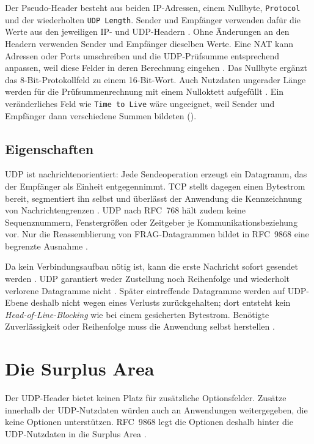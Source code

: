 Der Pseudo-Header besteht aus beiden IP-Adressen, einem Nullbyte, \texttt{Protocol} und der wiederholten
\texttt{UDP Length}. Sender und Empfänger verwenden dafür die Werte aus den jeweiligen IP- und UDP-Headern
\cite{rfc768}. Ohne Änderungen an den Headern verwenden Sender und Empfänger dieselben Werte.
Eine NAT kann Adressen oder Ports umschreiben und die UDP-Prüfsumme entsprechend anpassen, weil diese Felder
in deren Berechnung eingehen \cite[Sec.~11.3]{rfc9868}. Das Nullbyte ergänzt das 8-Bit-Protokollfeld zu einem
16-Bit-Wort. Auch Nutzdaten ungerader Länge werden für die Prüfsummenrechnung mit einem Nulloktett aufgefüllt
\cite{rfc768,rfc1071}. Ein veränderliches Feld wie \texttt{Time to Live} wäre ungeeignet, weil
Sender und Empfänger dann verschiedene Summen bildeten ().

\newpage

\subsection{Eigenschaften}
\label{subsec:udp-eigenschaften}

UDP ist nachrichtenorientiert: Jede Sendeoperation erzeugt ein Datagramm, das der Empfänger als Einheit
entgegennimmt. TCP stellt dagegen einen Bytestrom bereit, segmentiert ihn selbst und überlässt der Anwendung
die Kennzeichnung von Nachrichtengrenzen \cite[Sec.~2.2 und 3.7]{rfc9293}. UDP nach RFC~768 hält zudem keine
Sequenznummern, Fenstergrößen oder Zeitgeber je Kommunikationsbeziehung vor. Nur die Reassemblierung von
FRAG-Datagrammen bildet in RFC~9868 eine begrenzte Ausnahme \cite[Sec.~6]{rfc9868}.

Da kein Verbindungsaufbau nötig ist, kann die erste Nachricht sofort gesendet werden
\cite[Sec.~1]{rfc8085}. UDP garantiert weder Zustellung noch Reihenfolge und wiederholt verlorene
Datagramme nicht \cite{rfc768}. Später eintreffende Datagramme werden auf UDP-Ebene deshalb nicht wegen
eines Verlusts zurückgehalten; dort entsteht kein \textit{Head-of-Line-Blocking} wie bei einem gesicherten
Bytestrom. Benötigte Zuverlässigkeit oder Reihenfolge muss die Anwendung selbst herstellen
\cite[Sec.~3.3]{rfc8085}.

\section{Die Surplus Area}
\label{sec:surplus-area}

Der UDP-Header bietet keinen Platz für zusätzliche Optionsfelder. Zusätze innerhalb der UDP-Nutzdaten
würden auch an Anwendungen weitergegeben, die keine Optionen unterstützen. RFC~9868 legt die Optionen
deshalb hinter die UDP-Nutzdaten in die Surplus Area \cite[Sec.~4 und 7]{rfc9868}.

